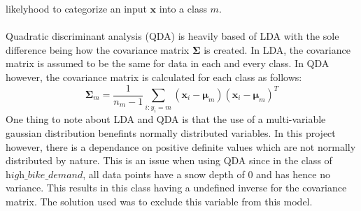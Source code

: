 likelyhood to categorize an input $\mathbf{x}$ into a class $m$.
\\
\\
Quadratic discriminant analysis (QDA) is heavily based of LDA with the sole difference being how the covariance matrix 
$\mathbf{\Sigma}$ is created.
In LDA, the covariance matrix is assumed to be the same for data in each and every class. In QDA however,
the covariance matrix is calculated for each class as follows:
\begin{equation*}
    \mathbf{\Sigma}_m = \frac{1}{n_m - 1} \sum_{i:y_i=m} 
    (\mathbf{x}_i-\mathbf{\mu}_m)(\mathbf{x}_i-\mathbf{\mu}_m)^T
\end{equation*}
One thing to note about LDA and QDA is that the use of a multi-variable gaussian distribution benefints normally distributed
variables. In this project however, there is a dependance on positive definite values which are not normally distributed
by nature. This is an issue when using QDA since in the class of $\textit{high\_bike\_demand}$, all data points have a 
snow depth of 0 and has hence no variance. This results in this class having a undefined inverse for the covariance matrix.
The solution used was to exclude this variable from this model. 






